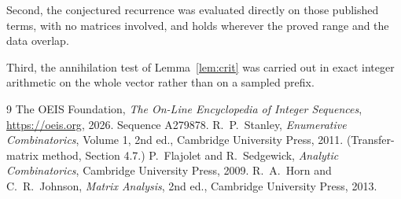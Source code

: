 \documentclass[11pt,a4paper]{article}
\theoremstyle{plain}
\theoremstyle{definition}
\begin{document}
Second, the conjectured recurrence was evaluated directly on those published terms, with no
matrices involved, and holds wherever the proved range and the data overlap.

Third, the annihilation test of Lemma~\ref{lem:crit} was carried out in exact integer
arithmetic on the whole vector rather than on a sampled prefix.

\begin{thebibliography}{9}
 The OEIS Foundation, \emph{The On-Line Encyclopedia of Integer
Sequences}, \url{https://oeis.org}, 2026. Sequence A279878.
 R.~P.~Stanley, \emph{Enumerative Combinatorics}, Volume 1, 2nd ed.,
Cambridge University Press, 2011. (Transfer-matrix method, Section 4.7.)
 P.~Flajolet and R.~Sedgewick, \emph{Analytic Combinatorics}, Cambridge
University Press, 2009.
 R.~A.~Horn and C.~R.~Johnson, \emph{Matrix Analysis}, 2nd ed., Cambridge
University Press, 2013.
\end{thebibliography}
\end{document}
